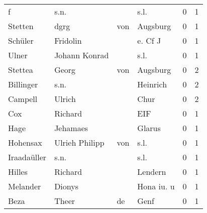 \begin{tabular}{llllrr}
                        f &                               s.n. &             &                                        s.l. &          0 &         1 \\
                  Stetten &                               dgrg &         von &                                    Augsburg &          0 &         1 \\
                  Schüler &                           Fridolin &             &                                     e. Cf J &          0 &         1 \\
                    Ulner &                      Johann Konrad &             &                                        s.l. &          0 &         1 \\
                  Stettea &                              Georg &         von &                                    Augsburg &          0 &         2 \\
                Billinger &                               s.n. &             &                                    Heinrich &          0 &         2 \\
                  Campell &                             Ulrich &             &                                        Chur &          0 &         2 \\
                      Cox &                            Richard &             &                                         EIF &          0 &         1 \\
                     Hage &                           Jehamaes &             &                                      Glarus &          0 &         1 \\
                 Hohensax &                     Ulrieh Philipp &         von &                                        s.l. &          0 &         1 \\
              Iraadaüller &                               s.n. &             &                                        s.l. &          0 &         1 \\
                   Hilles &                            Richard &             &                                     Lendern &          0 &         1 \\
                 Melander &                             Dionys &             &                                  Hona iu. u &          0 &         1 \\
                     Beza &                              Theer &          de &                                        Genf &          0 &         1 \\

\end{tabular}
